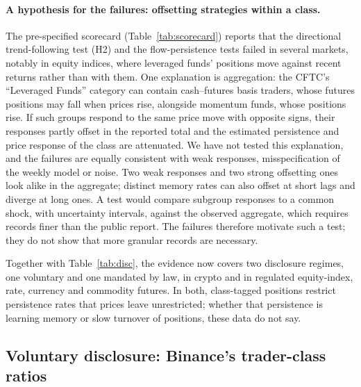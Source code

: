 \paragraph{A hypothesis for the failures: offsetting strategies within a class.} The pre-specified scorecard (Table~\ref{tab:scorecard}) reports that the directional trend-following test (H2) and the flow-persistence tests failed in several markets, notably in equity indices, where leveraged funds' positions move against recent returns rather than with them. One explanation is aggregation: the CFTC's ``Leveraged Funds'' category can contain cash--futures basis traders, whose futures positions may fall when prices rise, alongside momentum funds, whose positions rise. If such groups respond to the same price move with opposite signs, their responses partly offset in the reported total and the estimated persistence and price response of the class are attenuated. We have not tested this explanation, and the failures are equally consistent with weak responses, misspecification of the weekly model or noise. Two weak responses and two strong offsetting ones look alike in the aggregate; distinct memory rates can also offset at short lags and diverge at long ones. A test would compare subgroup responses to a common shock, with uncertainty intervals, against the observed aggregate, which requires records finer than the public report. The failures therefore motivate such a test; they do not show that more granular records are necessary.

Together with Table~\ref{tab:disc}, the evidence now covers two disclosure regimes, one voluntary and one mandated by law, in crypto and in regulated equity-index, rate, currency and commodity futures. In both, class-tagged positions restrict persistence rates that prices leave unrestricted; whether that persistence is learning memory or slow turnover of positions, these data do not say.

\subsection{Voluntary disclosure: Binance's trader-class ratios}\label{sec:disc_data}

